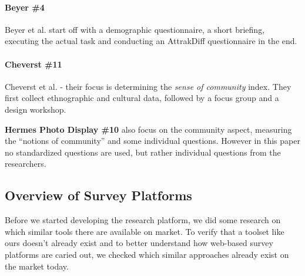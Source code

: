 	\paragraph{Beyer \#4} Beyer et al. start off with a demographic questionnaire, a short briefing, executing the actual task and conducting an AttrakDiff questionnaire in the end.

	\paragraph{Cheverst \#11} Cheverst et al. - their focus is determining the \textit{sense of community} index. They first collect ethnographic and cultural data, followed by a focus group and a design workshop.
		
		\textbf{Hermes Photo Display \#10} also focus on the community aspect, measuring the ``notions of community'' and some individual questions. However in this paper no standardized questions are used, but rather individual questions from the researchers.












	\subsection{Overview of Survey Platforms}
	Before we started developing the research platform, we did some research on which similar tools there are available on market. To verify that a toolset like ours doesn't already exist and to better understand how web-based survey platforms are caried out, we checked which similar approaches already exist on the market today.

